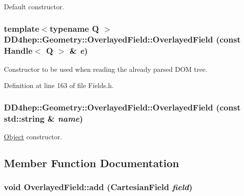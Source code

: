 Default constructor. \hypertarget{class_d_d4hep_1_1_geometry_1_1_overlayed_field_af64d7fb69a5f08d5f128afddbb604d3e}{
\subsubsection[{OverlayedField}]{\setlength{\rightskip}{0pt plus 5cm}template$<$typename Q $>$ DD4hep::Geometry::OverlayedField::OverlayedField (const {\bf Handle}$<$ Q $>$ \& {\em e})}}
\label{class_d_d4hep_1_1_geometry_1_1_overlayed_field_af64d7fb69a5f08d5f128afddbb604d3e}


Constructor to be used when reading the already parsed DOM tree. 

Definition at line 163 of file Fields.h.\hypertarget{class_d_d4hep_1_1_geometry_1_1_overlayed_field_afb142bf8642bee1ebd9a4ed733f4d90a}{
\subsubsection[{OverlayedField}]{\setlength{\rightskip}{0pt plus 5cm}DD4hep::Geometry::OverlayedField::OverlayedField (const std::string \& {\em name})}}
\label{class_d_d4hep_1_1_geometry_1_1_overlayed_field_afb142bf8642bee1ebd9a4ed733f4d90a}


\hyperlink{class_d_d4hep_1_1_geometry_1_1_overlayed_field_1_1_object}{Object} constructor. 

\subsection{Member Function Documentation}
\hypertarget{class_d_d4hep_1_1_geometry_1_1_overlayed_field_a035b1481dfc0a04b37a31795e3df0ba2}{
\subsubsection[{add}]{\setlength{\rightskip}{0pt plus 5cm}void OverlayedField::add ({\bf CartesianField} {\em field})}}
\label{class_d_d4hep_1_1_geometry_1_1_overlayed_field_a035b1481dfc0a04b37a31795e3df0ba2}


